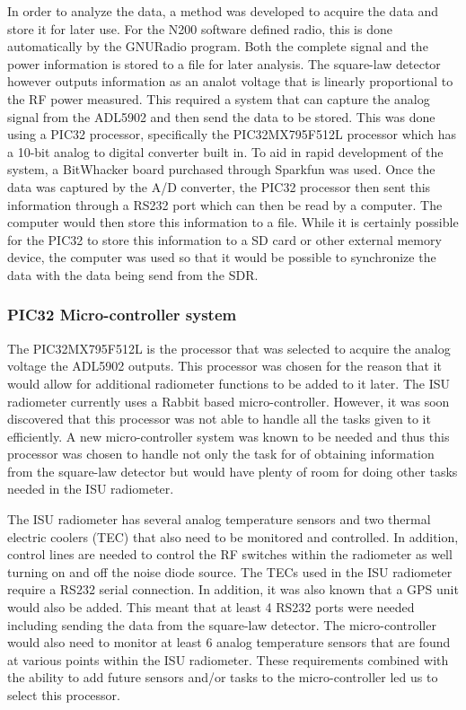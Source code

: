 In order to analyze the data, a method was developed to acquire the data and store it for later use.  For the N200 software defined radio, this is done automatically by the GNURadio program.  Both the complete signal and the power information is stored to a file for later analysis.  The square-law detector however outputs information as an analot voltage that is linearly proportional to the RF power measured.  This required a system that can capture the analog signal from the ADL5902 and then send the data to be stored.  This was done using a PIC32 processor, specifically the PIC32MX795F512L processor which has a 10-bit analog to digital converter built in.  To aid in rapid development of the system, a BitWhacker board purchased through Sparkfun was used.  Once the data was captured by the A/D converter, the PIC32 processor then sent this information through a RS232 port which can then be read by a computer.  The computer would then store this information to a file.  While it is certainly possible for the PIC32 to store this information to a SD card or other external memory device, the computer was used so that it would be possible to synchronize the data with the data being send from the SDR.

\subsubsection{PIC32 Micro-controller system}

The PIC32MX795F512L is the processor that was selected to acquire the analog voltage the ADL5902 outputs.  This processor was chosen for the reason that it would allow for additional radiometer functions to be added to it later.  The ISU radiometer currently uses a Rabbit based micro-controller.  However, it was soon discovered that this processor was not able to handle all the tasks given to it efficiently.  A new micro-controller system was known to be needed and thus this processor was chosen to handle not only the task for of obtaining information from the square-law detector but would have plenty of room for doing other tasks needed in the ISU radiometer. 

The ISU radiometer has several analog temperature sensors and two thermal electric coolers (TEC) that also need to be monitored and controlled.  In addition, control lines are needed to control the RF switches within the radiometer as well turning on and off the noise diode source.  The TECs used in the ISU radiometer require a RS232 serial connection.  In addition, it was also known that a GPS unit would also be added.  This meant that at least 4 RS232 ports were needed including sending the data from the square-law detector.  The micro-controller would also need to monitor at least 6 analog temperature sensors that are found at various points within the ISU radiometer.  These requirements combined with the ability to add future sensors and/or tasks to the micro-controller led us to select this processor.

